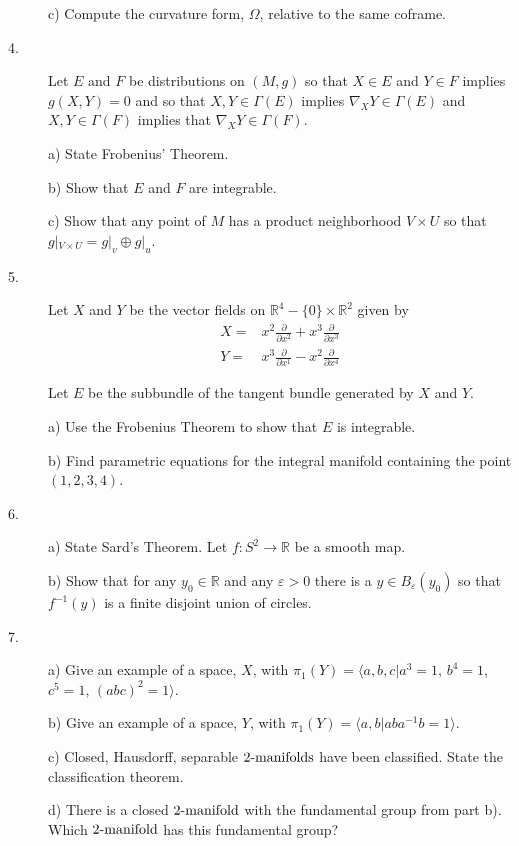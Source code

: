 \documentclass[bbb]{report}
\def\ds{\displaystyle}
\def\R{{\mathbb R}}
\begin{document}
\begin{description}
\item[\quad] c)
Compute the curvature form, $\Omega$, relative to the same coframe.



\item[4.]
Let $E$ and $F$ be distributions on $(M,g)$ so that
$X\in E$ and $Y\in F$ implies $g(X,Y)=0$
and so that
$X,Y\in\Gamma(E)$ implies $\nabla_XY\in\Gamma(E)$
and
$X,Y\in \Gamma(F)$ implies that $\nabla_XY\in\Gamma(F)$.

\item[\quad] a)
State Frobenius' Theorem.

\item[\quad] b)
Show that $E$ and $F$ are integrable.

\item[\quad] c)
Show that any point of $M$ has a product neighborhood
$V\times U$ so that $g|_{V\times U}=g|_v\oplus g|_u$.


\item[5.]
Let $X$ and $Y$ be the vector fields on $\R^4-\{0\}\times\R^2$
given by
$$  \begin{array}{ll}
X=&x^2\ds\frac{\partial}{\partial x^2}+x^3\frac{\partial}{\partial x^3}\\
Y=&x^3 \ds\frac{\partial}{\partial x^1} - x^2\frac{\partial}{\partial x^4}
\end{array} $$

Let $E$ be the subbundle of the tangent bundle generated by $X$
and $Y$.

\item[\quad] a)
Use the Frobenius Theorem to show that $E$ is integrable.

\item[\quad] b)
Find parametric equations for the integral manifold containing the point
$(1,2,3,4)$.

\item[6.]a)
State Sard's Theorem.
Let $f:S^2\to\R$ be a smooth map.

\item[\quad] b)
Show that for any $y_0\in\R$ and any $\varepsilon>0$ there is a
$y\in B_\varepsilon(y_0)$ so that
$f^{-1}(y)$ is a finite disjoint union of circles.

\item[7.]a)
Give an example of a space, $X$, with $\pi_1(Y)=\langle a,b,c|a^3=1$,
$b^4=1$,
 $c^5=1$, $ (abc)^2=1\rangle$.

\item[\quad] b)
Give an example of a space, $Y$,
with $\pi_1(Y)=\langle a,b|aba^{-1}b=1\rangle$.

\item[\quad] c)
Closed, Hausdorff, separable $2\hbox{-manifolds}$ have been classified.
State the classification theorem.

\item[\quad] d)
There is a closed $2\hbox{-manifold}$ with the fundamental group
from part b). Which $2\hbox{-manifold}$ has this fundamental group?




\vfill

\end{description}

\end{document}
